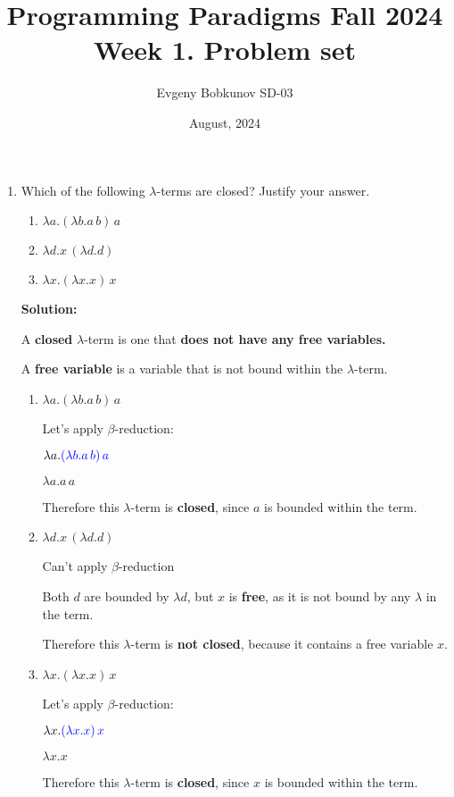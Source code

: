 \documentclass{article}
\title{Programming Paradigms
Fall 2024
Week 1. Problem set}
\author{Evgeny Bobkunov SD-03}
\date{August, 2024}
\begin{document}
\maketitle

\begin{enumerate}
    \item Which of the following $\lambda$-terms are closed? Justify your answer.
    \begin{enumerate}
        \item $\lambda a.(\lambda b.a \, b) \, a$
        \item $\lambda d.x \, (\lambda d.d)$
        \item $\lambda x.(\lambda x.x) \, x$
    \end{enumerate}

    \textbf{Solution:}

    
    A \textbf{closed} $\lambda$-term is one that \textbf{does not have any free variables.}

    
    A \textbf{free variable} is a variable that is not bound within the $\lambda$-term.
    \begin{enumerate}
        \item $\lambda a.(\lambda b.a \, b) \, a$
        
    Let's apply $\beta$-reduction: 

    $\lambda a.\textcolor{blue}{(\lambda b.a \, b) \, a}$
    
    $\lambda a.a \, a$

    Therefore this $\lambda$-term is \textbf{closed}, since $a$ is bounded within the term.
        \item $\lambda d.x \, (\lambda d.d)$

    Can't apply $\beta$-reduction

    Both $d$ are bounded by $\lambda d$, but $x$ is \textbf{free}, as it is not bound by any $\lambda$ in the term.

    Therefore this $\lambda$-term is \textbf{not closed}, because it contains a free variable $x$.
        \item $\lambda x.(\lambda x.x) \, x$

    Let's apply $\beta$-reduction: 

    $\lambda x.\textcolor{blue}{(\lambda x.x) \, x}$
    
    $\lambda x.x$

    Therefore this $\lambda$-term is \textbf{closed}, since $x$ is bounded within the term.
    \end{enumerate}


\end{enumerate}
\end{document}

